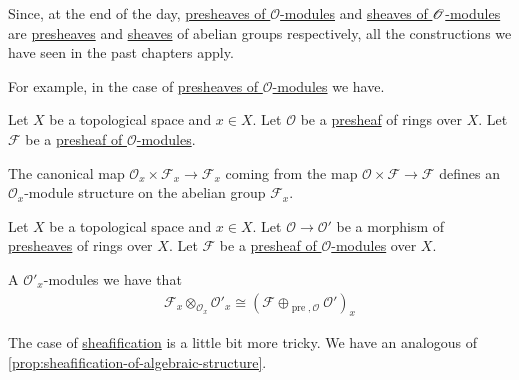 \documentclass[../../../main]{subfiles}
\begin{document}
Since, at the end of the day, \hyperref[def:presheaf-of-modules]{presheaves of \(\mathcal{O}\)-modules} and \hyperref[def:sheaf-of-modules]{sheaves of \(\mathscr{O}\)-modules} are \hyperref[def:presheaf]{presheaves} and \hyperref[def:sheaf]{sheaves} of abelian groups respectively, all the constructions we have seen in the past chapters apply.

For example, in the case of \hyperref[def:presheaf-of-modules]{presheaves of \(\mathcal{O}\)-modules} we have.
\begin{lemma}
  Let \(X\) be a topological space and \(x \in X\).
  Let \(\mathcal{O}\) be a \hyperref[def:presheaf]{presheaf} of rings over \(X\).
  Let \(\mathcal{F}\) be a \hyperref[def:presheaf-of-modules]{presheaf of \(\mathcal{O}\)-modules}.

  The canonical map \(\mathcal{O}_{x} \times \mathcal{F}_{x} \to \mathcal{F}_{x}\) coming from the map \(\mathcal{O} \times \mathcal{F} \to \mathcal{F}\) defines an \(\mathcal{O}_{x}\)-module structure on the abelian group \(\mathcal{F}_{x}\).
\end{lemma}

\begin{lemma}
  Let \(X\) be a topological space and \(x \in X\).
  Let \(\mathcal{O} \to \mathcal{O}'\) be a morphism of \hyperref[def:presheaf]{presheaves} of rings over \(X\).
  Let \(\mathcal{F}\) be a \hyperref[def:presheaf-of-modules]{presheaf of \(\mathcal{O}\)-modules} over \(X\).

  A \(\mathcal{O}'_{x}\)-modules we have that
  \begin{align*}
    \mathcal{F}_{x} \otimes_{\mathcal{O}_{x}} \mathcal{O}'_{x} \cong (\mathcal{F} \oplus_{\operatorname{pre}, \mathcal{O}} \mathcal{O}')_{x}
  \end{align*}
\end{lemma}

The case of \hyperref[def:sheafification]{sheafification} is a little bit more tricky.
We have an analogous of \autoref{prop:sheafification-of-algebraic-structure}.
\end{document}
